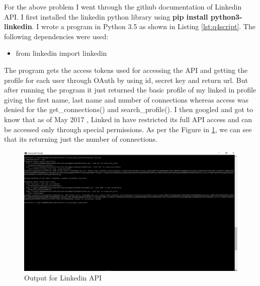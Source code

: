 \documentclass[letterpaper,11pt]{article}
\begin{document}
For the above problem I went through the github documentation \cite{linkref} of Linkedin API. I first installed the linkedin python library using  \textbf{pip install python3-linkedin}. I wrote a program in Python 3.5 as shown in Listing \ref{lst:q4script}. The following dependencies were used:

\begin{itemize}
    \item from linkedin import linkedin
\end{itemize}

The program gets the access tokens used for accessing the API and getting the profile for each user through OAuth by using id, secret key and return url. But after running the program it just returned the basic profile of my linked in profile giving the first name, last name and number of connections whereas access was denied for the get\_connections() and search\_profile(). I then googled and got to know that as of May 2017 \cite{permref}, Linked in have restricted its full API access and can be accessed only through special permissions. As per the Figure in  \ref{fig:q4link}, we can see that its returning just the number of connections.




\begin{figure}[h]
\centering
\includegraphics[scale=0.3]{linked.png}
\caption{Output for Linkedin API}
\label{fig:q4link}
\end{figure}



\clearpage
\end{document}
